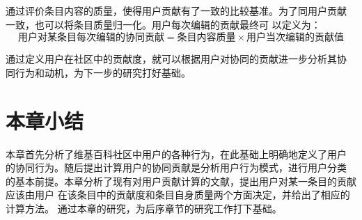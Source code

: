 通过评价条目内容的质量，使得用户贡献有了一致的比较基准。为了同用户贡献
一致，也可以将条目质量归一化。用户每次编辑的贡献最终可
以定义为：
\[
\text{用户对某条目每次编辑的协同贡献}=\text{条目内容质量} \times  
\text{用户当次编辑的贡献值}
\]


通过定义用户在社区中的贡献度，就可以根据用户对协同的贡献进一步分析其协
同行为和动机，为下一步的研究打好基础。




\section{本章小结}
本章首先分析了维基百科社区中用户的各种行为，在此基础上明确地定义了用户
的协同行为。随后提出计算用户的协同贡献是分析用户行为模式，进行用户分类
的基本前提。本章分析了现有对用户贡献计算的文献，提出用户对某一条目的贡献应该由用户
在该条目中的贡献度和条目自身质量两个方面决定，并给出了相应的计算方法。
通过本章的研究，为后序章节的研究工作打下基础。


